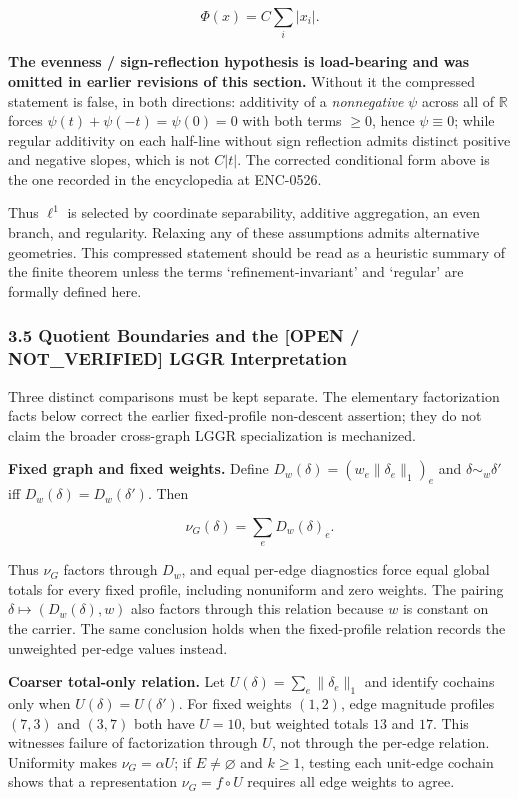 \documentclass[
  11pt,
]{article}
\begin{document}
\[
\Phi(x)=C\sum_i |x_i|.
\]

\textbf{The evenness / sign-reflection hypothesis is load-bearing and
was omitted in earlier revisions of this section.} Without it the
compressed statement is false, in both directions: additivity of a
\emph{nonnegative} \(\psi\) across all of \(\mathbb R\) forces
\(\psi(t)+\psi(-t)=\psi(0)=0\) with both terms \(\ge0\), hence
\(\psi\equiv0\); while regular additivity on each half-line without sign
reflection admits distinct positive and negative slopes, which is not
\(C|t|\). The corrected conditional form above is the one recorded in
the encyclopedia at ENC-0526.

Thus \(\ell^1\) is selected by coordinate separability, additive
aggregation, an even branch, and regularity. Relaxing any of these
assumptions admits alternative geometries. This compressed statement
should be read as a heuristic summary of the finite theorem unless the
terms `refinement-invariant' and `regular' are formally defined here.

\hypertarget{quotient-boundaries-and-the-open-not_verified-lggr-interpretation}{%
\subsubsection{\texorpdfstring{3.5 Quotient Boundaries and the
\textbf{{[}OPEN / NOT\_VERIFIED{]}} LGGR
Interpretation}{3.5 Quotient Boundaries and the {[}OPEN / NOT\_VERIFIED{]} LGGR Interpretation}}\label{quotient-boundaries-and-the-open-not_verified-lggr-interpretation}}

Three distinct comparisons must be kept separate. The elementary
factorization facts below correct the earlier fixed-profile non-descent
assertion; they do not claim the broader cross-graph LGGR specialization
is mechanized.

\textbf{Fixed graph and fixed weights.} Define
\(D_w(\delta)=(w_e\|\delta_e\|_1)_e\) and \(\delta\sim_w\delta'\) iff
\(D_w(\delta)=D_w(\delta')\). Then

\[
\nu_G(\delta)=\sum_e D_w(\delta)_e.
\]

Thus \(\nu_G\) factors through \(D_w\), and equal per-edge diagnostics
force equal global totals for every fixed profile, including nonuniform
and zero weights. The pairing \(\delta\mapsto(D_w(\delta),w)\) also
factors through this relation because \(w\) is constant on the carrier.
The same conclusion holds when the fixed-profile relation records the
unweighted per-edge values instead.

\textbf{Coarser total-only relation.} Let
\(U(\delta)=\sum_e\|\delta_e\|_1\) and identify cochains only when
\(U(\delta)=U(\delta')\). For fixed weights \((1,2)\), edge magnitude
profiles \((7,3)\) and \((3,7)\) both have \(U=10\), but weighted totals
\(13\) and \(17\). This witnesses failure of factorization through
\(U\), not through the per-edge relation. Uniformity makes
\(\nu_G=\alpha U\); if \(E\ne\varnothing\) and \(k\ge1\), testing each
unit-edge cochain shows that a representation \(\nu_G=f\circ U\)
requires all edge weights to agree.
\end{document}
